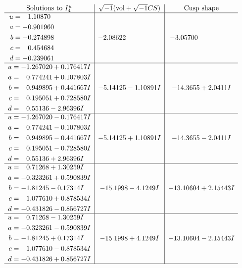 \documentclass[1p]{elsarticle_modified}
\theoremstyle{definition}
\newcommand{\I}{\sqrt{-1}}
\begin{document}
$$\begin{array}{c|c|c}  
\text{Solutions to }I^u_{4}& \I (\text{vol} + \sqrt{-1}CS) & \text{Cusp shape}\\
 \hline 
\begin{aligned}
u &= \phantom{-}1.10870\phantom{ +0.000000I} \\
a &= -0.901960\phantom{ +0.000000I} \\
b &= -0.274898\phantom{ +0.000000I} \\
c &= \phantom{-}0.454684\phantom{ +0.000000I} \\
d &= -0.239061\phantom{ +0.000000I}\end{aligned}
 & -2.08622\phantom{ +0.000000I} & -3.05700\phantom{ +0.000000I} \\ \hline\begin{aligned}
u &= -1.267020 + 0.176417 I \\
a &= \phantom{-}0.774241 + 0.107803 I \\
b &= \phantom{-}0.949895 + 0.441667 I \\
c &= \phantom{-}0.195051 + 0.728580 I \\
d &= \phantom{-}0.55136 - 2.96396 I\end{aligned}
 & -5.14125 - 1.10891 I & -14.3655 + 2.0411 I \\ \hline\begin{aligned}
u &= -1.267020 - 0.176417 I \\
a &= \phantom{-}0.774241 - 0.107803 I \\
b &= \phantom{-}0.949895 - 0.441667 I \\
c &= \phantom{-}0.195051 - 0.728580 I \\
d &= \phantom{-}0.55136 + 2.96396 I\end{aligned}
 & -5.14125 + 1.10891 I & -14.3655 - 2.0411 I \\ \hline\begin{aligned}
u &= \phantom{-}0.71268 + 1.30259 I \\
a &= -0.323261 + 0.590839 I \\
b &= -1.81245 - 0.17314 I \\
c &= \phantom{-}1.077610 + 0.878534 I \\
d &= -0.431826 - 0.856727 I\end{aligned}
 & -15.1998 - 4.1249 I & -13.10604 + 2.15443 I \\ \hline\begin{aligned}
u &= \phantom{-}0.71268 - 1.30259 I \\
a &= -0.323261 - 0.590839 I \\
b &= -1.81245 + 0.17314 I \\
c &= \phantom{-}1.077610 - 0.878534 I \\
d &= -0.431826 + 0.856727 I\end{aligned}
 & -15.1998 + 4.1249 I & -13.10604 - 2.15443 I\\
 \hline 
 \end{array}$$\newpage\newpage\renewcommand{\arraystretch}{1}
\end{document}
